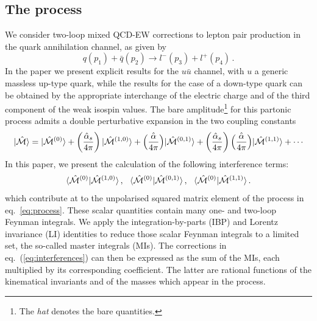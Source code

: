 \documentclass[11pt,a4paper]{article}
\begin{document}
\subsection{The process}
We consider two-loop mixed QCD-EW corrections to lepton pair production in the quark annihilation channel, as given by
\begin{equation}
 q(p_1) + \bar{q}(p_2) \rightarrow l^{-}(p_3) + l^{+} (p_4) \,.
\label{eq:process}
\end{equation}
In the paper we present explicit results for the $u\bar u$ channel,
with $u$ a generic massless up-type quark,
while the results for the case of a down-type quark can be obtained
by the appropriate interchange of the electric charge and of the third component of the weak isospin values.
%
The bare amplitude\footnote{The \textit{hat} denotes the bare quantities.}
for this partonic process admits a double perturbative expansion in the two coupling constants
\begin{align}
 |\hat{\cal M} \rangle = |\hat{\cal M}^{(0)} \rangle + \left( \frac{\hat\alpha_s}{4 \pi} \right) |\hat{\cal M}^{(1,0)} \rangle + \hat{\left( \frac{\alpha}{4 \pi} \right)} |\hat{\cal M}^{(0,1)} \rangle + \left( \frac{\hat\alpha_s}{4 \pi} \right) \hat{\left( \frac{\alpha}{4 \pi} \right)} |\hat{\cal M}^{(1,1)} \rangle + \cdots
\end{align}
%
In this paper, we present the calculation of the following interference terms:
\begin{equation}
  \langle \hat{\cal M}^{(0)} | \hat{\cal M}^{(1,0)} \rangle \,, ~~
  \langle \hat{\cal M}^{(0)} | \hat{\cal M}^{(0,1)} \rangle \,, ~~
  \langle \hat{\cal M}^{(0)} | \hat{\cal M}^{(1,1)} \rangle \,.
  \label{eq:interferences}
\end{equation}
which contribute at \oaas to the unpolarised squared matrix element
of the process in eq.~\eqref{eq:process}.
These scalar quantities contain many one- and two-loop Feynman integrals.
We apply the
integration-by-parts (IBP) \cite{Tkachov:1981wb,Chetyrkin:1981qh} and
Lorentz invariance (LI) \cite{Gehrmann:1999as} identities
to reduce those scalar Feynman integrals to a limited set, the so-called master integrals (MIs).
The corrections in eq.~(\ref{eq:interferences}) can then be expressed as the sum of the MIs, each
multiplied by its corresponding coefficient.
The latter are rational functions of the kinematical invariants
and of the masses which appear in the process.
\end{document}

